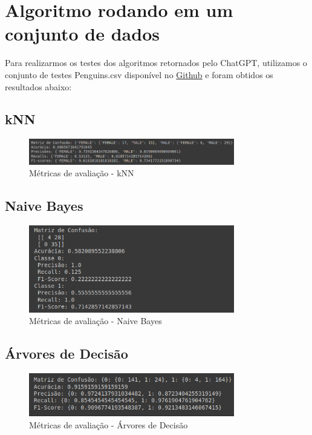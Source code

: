 \documentclass[12pt]{article}
\begin{document}
\section{Algoritmo rodando em um conjunto de dados}

Para realizarmos os testes dos algoritmos retornados pelo ChatGPT, utilizamos o conjunto de testes Penguins.csv disponível no \href{https://github.com/mwaskom/seaborn-data/blob/master/penguins.csv}{Github} e foram obtidos os resultados abaixo:

\subsection{kNN}

\begin{figure}[H]
\centering
\includegraphics[width=0.8\textwidth]{figures/knn.png}
\caption{Métricas de avaliação - kNN}
\label{fig:exampleFig1}
\end{figure}

\subsection{Naive Bayes}

\begin{figure}[H]
\centering
\includegraphics[width=0.8\textwidth]{figures/naive_bayes.png}
\caption{Métricas de avaliação - Naive Bayes}
\label{fig:exampleFig1}
\end{figure}

\subsection{Árvores de Decisão}

\begin{figure}[H]
\centering
\includegraphics[width=0.8\textwidth]{figures/arvore_decisao.png}
\caption{Métricas de avaliação - Árvores de Decisão}
\label{fig:exampleFig1}
\end{figure}
\end{document}
